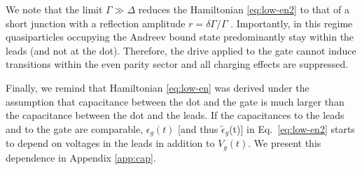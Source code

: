 \documentclass[aps,reprint,longbibliography, prb]{revtex4-2}
\begin{document}
We note that the limit $\Gamma\gg\Delta$ reduces the Hamiltonian \eqref{eq:low-en2} to that of a short junction with a reflection amplitude $r = \delta\Gamma/\Gamma$ \cite{zazunov2003}. Importantly, in this regime quasiparticles occupying the Andreev bound state predominantly stay within the leads (and not at the dot). Therefore, the drive applied to the gate cannot induce transitions within the even parity sector and all charging effects are suppressed.

Finally, we remind that Hamiltonian \eqref{eq:low-en} was derived under the assumption that capacitance between the dot and the gate is much larger than the capacitance between the dot and the leads. If the capacitances to the leads and to the gate are comparable, $\epsilon_g(t)$ [and thus $\tilde{\epsilon}_g$(t)] in Eq.~\eqref{eq:low-en2} starts to depend on voltages in the leads in addition to $V_g(t)$. We present this dependence in Appendix \ref{app:cap}.
\end{document}

